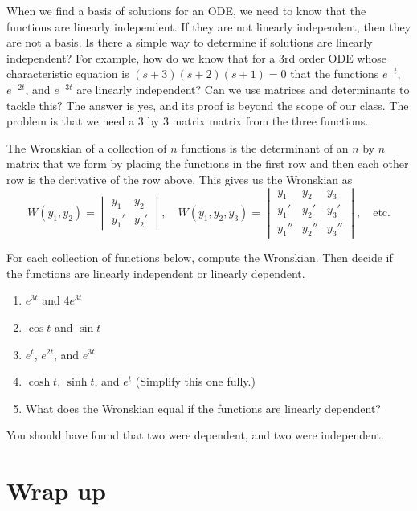 When we find a basis of solutions for an ODE, we need to know that the functions are linearly independent.  If they are not linearly independent, then they are not a basis. Is there a simple way to determine if solutions are linearly independent?  For example, how do we know that for a 3rd order ODE whose characteristic equation is $(s+3)(s+2)(s+1)=0$ that the functions $e^{-t}$, $e^{-2t}$, and $e^{-3t}$ are linearly independent?  Can we use matrices and determinants to tackle this?  The answer is yes, and its proof is beyond the scope of our class.  The problem is that we need a 3 by 3 matrix matrix from the three functions.
\begin{definition}[Wronskian]
 The Wronskian of a collection of $n$ functions is the determinant of an $n$ by $n$ matrix that we form by placing the functions in the first row and then each other row is the derivative of the row above.  This gives us the Wronskian as
$$W(y_1,y_2) = 
\begin{vmatrix}
 y_1&y_2\\
 y_1'&y_2'
\end{vmatrix}
,\quad
W(y_1,y_2,y_3) = 
\begin{vmatrix}
 y_1&y_2&y_3\\
 y_1'&y_2'&y_3'\\
 y_1''&y_2''&y_3''
\end{vmatrix},
\quad \text{etc.}$$
\end{definition}

\begin{problem}
 For each collection of functions below, compute the Wronskian. Then decide if the functions are linearly independent or linearly dependent.
\begin{enumerate}
 \item $e^{3t}$ and $4e^{3t}$
 \item $\cos t$ and $\sin t$
 \item $e^t$, $e^{2t}$, and $e^{3t}$
 \item $\cosh t$, $\sinh t$, and $e^{t}$ (Simplify this one fully.)
 \item What does the Wronskian equal if the functions are linearly dependent?
\end{enumerate}
You should have found that two were dependent, and two were independent. 
\end{problem}




\section*{Wrap up}

